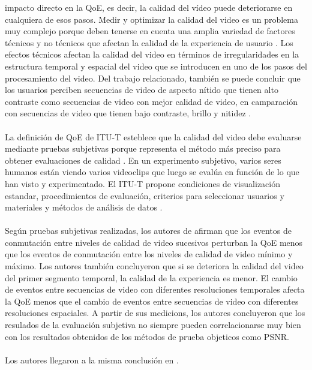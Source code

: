 \documentclass[conference]{IEEEtran}
\begin{document}
    impacto directo en la QoE, es decir, la calidad del vídeo puede deteriorarse en cualquiera
    de esos pasos. Medir y optimizar la calidad del video es un problema muy 
    complejo porque deben tenerse en cuenta una amplia variedad 
    de factores técnicos y no técnicos que afectan la calidad de la 
    experiencia de usuario \cite{biblio11}. Los efectos técnicos afectan la calidad 
    del video en términos de irregularidades en la estructura temporal y espacial del 
    video que se introducen en uno de los pasos del procesamiento del video. Del trabajo 
    relacionado, también se puede concluir que los usuarios perciben secuencias de video 
    de aspecto nítido que tienen alto contraste como secuencias de video con mejor 
    calidad de video, en camparación con secuencias de video que tienen bajo 
    contraste, brillo y nitidez \cite{biblio12}.\\
    \\  
    La definición de QoE de ITU-T esteblece que la calidad del video 
    debe evaluarse mediante pruebas subjetivas porque representa el 
    método más preciso para obtener evaluaciones de calidad \cite{biblio13}. En un 
    experimento subjetivo, varios seres humanos están viendo varios 
    videoclips que luego se evalúa en función de lo que han visto y 
    experimentado. El ITU-T propone condiciones de visualización 
    estandar, procedimientos de evaluación, criterios para seleccionar 
    usuarios y materiales y métodos de análisis de datos \cite{biblio14}.\\
    \\
    Según pruebas subjetivas realizadas, los autores de \cite{biblio15}afirman 
    que los eventos de conmutación entre niveles de calidad de video 
    sucesivos perturban la QoE menos que los eventos de conmutación 
    entre los niveles de calidad de video mínimo y máximo. Los autores 
    también concluyeron que si se deteriora la calidad del video del 
    primer segmento temporal, la calidad de la experiencia es menor. El 
    cambio de eventos entre secuencias de video con diferentes 
    resoluciones temporales afecta la QoE menos que el cambio de 
    eventos entre secuencias de video con diferentes resoluciones 
    espaciales. A partir de sus medicions, los autores concluyeron que 
    los resulados de la evaluación subjetiva no siempre pueden 
    correlacionarse  muy bien con los resultados obtenidos de los 
    métodos de prueba objeticos como PSNR.\\
    \\
    Los autores llegaron a la misma conclusión en \cite{biblio16,biblio17}.
\end{document}
